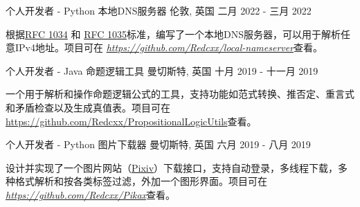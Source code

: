 \begin{cventries}
  \cventry
    {个人开发者 - Python} %
    {本地DNS服务器} %
    {伦敦, 英国} %
    {二月 2022 - 三月 2022} %
    {
      \begin{cvitems} %
        \item {根据\href{https://datatracker.ietf.org/doc/html/rfc1034}{RFC 1034} 和 \href{https://datatracker.ietf.org/doc/html/rfc1035}{RFC 1035}标准，编写了一个本地DNS服务器，可以用于解析任意IPv4地址。项目可在 \href{https://github.com/Redcxx/local-nameserver}{\textit{https://github.com/Redcxx/local-nameserver}}查看。}
      \end{cvitems}
    }
    


  \cventry
    {个人开发者 - Java} %
    {命题逻辑工具} %
    {曼切斯特, 英国} %
    {十月 2019 - 十一月 2019} %
    {
      \begin{cvitems} %
        \item {一个用于解析和操作命题逻辑公式的工具，支持功能如范式转换、推否定、重言式和矛盾检查以及生成真值表。项目可在\href{https://github.com/Redcxx/PropositionalLogicUtils}{https://github.com/Redcxx/PropositionalLogicUtils}查看。}
      \end{cvitems}
    }

  \cventry
    {个人开发者 - Python} %
    {图片下载器} %
    {曼切斯特, 英国} %
    {六月 2019 - 八月 2019} %
    {
      \begin{cvitems} %
        \item {设计并实现了一个图片网站（\href{https://www.pixiv.net/}{Pixiv}）下载接口，支持自动登录，多线程下载，多种格式解析和按各类标签过滤，外加一个图形界面。项目可在 \href{https://github.com/Redcxx/Pikax}{\textit{https://github.com/Redcxx/Pikax}}查看。}
      \end{cvitems}
    }


\end{cventries}
